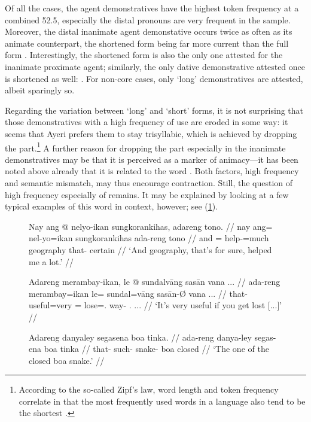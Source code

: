 Of all the cases, the agent demonstratives have the highest token frequency at
a combined 52.5\pct{}, especially the distal pronouns are very frequent in the
sample. Moreover, the distal inanimate agent demonstative occurs twice as often
as its animate counterpart, the shortened form  being far more current than the full form .
Interestingly, the shortened form  is also the
only one attested for the inanimate proximate agent; similarly, the only dative
demonstrative attested once is shortened as well: . For non-core cases, only `long' demonstratives are attested, albeit
sparingly so.

Regarding the variation between `long' and `short' forms, it is not surprising
that those demonstratives with a high frequency of use are eroded in some way:
it seems that Ayeri prefers them to stay trisyllabic, which is achieved by
dropping the  part.\footnote{According to the so-called Zipf's
law, word length and token frequency correlate in that the most frequently used
words in a language also tend to be the shortest \citep[25--27]{zipf1935}.} A
further reason for dropping the  part especially in the inanimate
demonstratives may be that it is perceived as a marker of animacy---it has been
noted above already that it is related to the word .
Both factors, high frequency and semantic mismatch, may thus encourage
contraction. Still, the question of high frequency especially of 
 remains. It may be explained by looking at a few 
typical examples of this word in context, however; see (\ref{ex:demexpl}).

\begin{figure}[h]
\pex[glspace=0.5em]\label{ex:demexpl}
\a\begingl
	\gla Nay ang @ nelyo-ikan sungkorankihas, adareng tono. //
	\glb nay ang= nel-yo=ikan sungkorankihas ada-reng tono //
	\glc and \AgtT{}= help-\TsgN{}=much geography that-\AargI{} certain //
	\glft `And geography, that's for sure, helped me a lot.'%
		 //
\endgl

\a\begingl
	\gla Adareng merambay-ikan, le @ sundalvāng sasān {vana ...} //
	\glb ada-reng merambay=ikan le= sundal=vāng sasān-Ø {vana ...} //
	\glc that-\AargI{} useful=very \PatTI{}= lose=\Second{}.\Aarg{} way-\Top{} 
		{\Second{}.\Gen{} ...} //
	\glft `It’s very useful if you get lost [...]'%
		 //
\endgl

\a\begingl
	\gla Adareng danyaley segasena boa tinka. //
	\glb ada-reng danya-ley segas-ena boa tinka //
	\glc that-\AargI{} such-\PargI{} snake-\Gen{} boa closed //
	\glft `The one of the closed boa snake.'\footnotemark%
		 //
\endgl
\xe
\end{figure}

